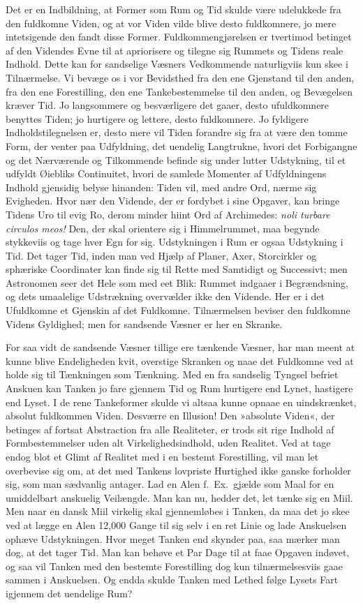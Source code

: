 \documentclass[12pt]{book}
\newcommand{\apage}[1]{\marginnote{\footnotesize\textit{[#1]}}}
\begin{document}
Det er en Indbildning, at Former som Rum og Tid skulde være udelukkede fra
den fuldkomne Viden, og at vor Viden vilde blive desto fuldkomnere, jo mere
intetsigende den fandt disse Former. Fuldkommengjørelsen er tvertimod
betinget af den Videndes Evne til at apriorisere og tilegne sig Rummets og
Tidens reale Indhold. Dette kan for sandselige Væsners Vedkommende
naturligviis kun skee i Tilnærmelse. Vi bevæge os i vor Bevidsthed fra den
ene Gjenstand til den anden, fra den ene Forestilling, den ene
Tankebestemmelse til den anden, og Bevægelsen kræver Tid. Jo langsommere og
besværligere det gaaer, desto ufuldkomnere benyttes Tiden; jo hurtigere og
lettere, desto fuldkomnere. Jo fyldigere Indholdstilegnelsen er, desto mere
vil Tiden forandre sig fra at være den tomme Form, der venter paa
Udfyldning, det uendelig Langtrukne, hvori det Forbigangne og det
Nærværende og Tilkommende befinde sig under lutter Udstykning, til et
udfyldt Øiebliks Continuitet, hvori de samlede Momenter af Udfyldningens
Indhold gjensidig belyse hinanden: Tiden vil, med andre Ord, nærme sig
Evigheden. Hvor nær den Vidende, der er fordybet i sine \apage{64} Opgaver, kan bringe
Tidens Uro til evig Ro, derom minder hiint Ord af Archimedes: \emph{noli
turbare circulos meos!} Den, der skal orientere sig i Himmelrummet, maa
begynde stykkeviis og tage hver Egn for sig. Udstykningen i Rum er ogsaa
Udstykning i Tid. Det tager Tid, inden man ved Hjælp af Planer, Axer,
Storcirkler og sphæriske Coordinater kan finde sig til Rette med Samtidigt
og Successivt; men Astronomen seer det Hele som med eet Blik: Rummet
indgaaer i Begrændsning, og dets umaalelige Udstrækning overvælder ikke den
Vidende. Her er i det Ufuldkomne et Gjenskin af det Fuldkomne. Tilnærmelsen
beviser den fuldkomne Videns Gyldighed; men for sandsende Væsner er her en
Skranke.

For saa vidt de sandsende Væsner tillige ere tænkende Væsner, har man meent
at kunne blive Endeligheden kvit, overstige Skranken og naae det Fuldkomne
ved at holde sig til Tænkningen som Tænkning. Med en fra sandselig Tyngsel
befriet Anskuen kan Tanken jo fare gjennem Tid og Rum hurtigere end Lynet,
hastigere end Lyset. I de rene Tankeformer skulde vi altsaa kunne opnaae en
uindskrænket, absolut fuldkommen Viden. Desværre en Illusion! Den »absolute
Viden«, der betinges af fortsat Abstraction fra alle Realiteter, er trods
sit rige Indhold af Formbestemmelser uden alt Virkelighedsindhold, uden
Realitet. Ved at tage endog blot et Glimt af Realitet med i en bestemt
Forestilling, vil man let overbevise sig om, at det med Tankens lovpriste
Hurtighed ikke ganske forholder sig, som man sædvanlig antager. Lad en Alen \apage{65} 
f.\ Ex.\ gjælde som Maal for en umiddelbart anskuelig Veilængde. Man kan
nu, hedder det, let tænke sig en Miil. Men naar en dansk Miil virkelig skal
gjennemløbes i Tanken, da maa det jo skee ved at lægge en Alen 12,000 Gange
til sig selv i en ret Linie og lade Anskuelsen ophæve Udstykningen. Hvor
meget Tanken end skynder paa, saa mærker man dog, at det tager Tid. Man kan
behøve et Par Dage til at faae Opgaven indøvet, og saa vil Tanken med den
bestemte Forestilling dog kun tilnærmelsesviis gaae sammen i Anskuelsen. Og
endda skulde Tanken med Lethed følge Lysets Fart igjennem det uendelige
Rum?
\end{document}
